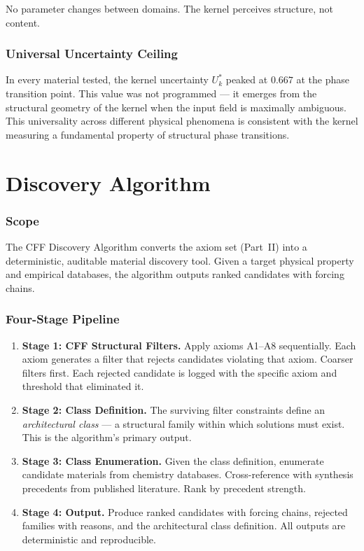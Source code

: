 \documentclass[11pt, a4paper]{article}
\begin{document}
No parameter changes between domains. The kernel perceives
structure, not content.

\section{Universal Uncertainty Ceiling}

In every material tested, the kernel uncertainty $U^*_k$
peaked at $\mathbf{0.667}$ at the phase transition point.
This value was not programmed --- it emerges from the structural
geometry of the kernel when the input field is maximally
ambiguous. This universality across different physical phenomena
is consistent with the kernel measuring a fundamental property
of structural phase transitions.

\newpage
\part{Discovery Algorithm}

\section{Scope}

The CFF Discovery Algorithm converts the axiom set (Part~II)
into a deterministic, auditable material discovery tool. Given
a target physical property and empirical databases, the algorithm
outputs ranked candidates with forcing chains.

\section{Four-Stage Pipeline}

\begin{enumerate}
  \item \textbf{Stage 1: CFF Structural Filters.}
    Apply axioms A1--A8 sequentially. Each axiom generates a
    filter that rejects candidates violating that axiom. Coarser
    filters first. Each rejected candidate is logged with the
    specific axiom and threshold that eliminated it.

  \item \textbf{Stage 2: Class Definition.}
    The surviving filter constraints define an
    \textit{architectural class} --- a structural family within
    which solutions must exist. This is the algorithm's primary
    output.

  \item \textbf{Stage 3: Class Enumeration.}
    Given the class definition, enumerate candidate materials
    from chemistry databases. Cross-reference with synthesis
    precedents from published literature. Rank by precedent
    strength.

  \item \textbf{Stage 4: Output.}
    Produce ranked candidates with forcing chains, rejected
    families with reasons, and the architectural class
    definition. All outputs are deterministic and reproducible.
\end{enumerate}
\end{document}

